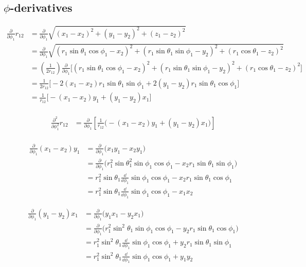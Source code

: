 \subsection*{$\phi$-derivatives}
\begin{align*}
    \frac{\partial}{\partial \phi_1}r_{12}
    &= \frac{\partial}{\partial \phi_1} \sqrt{(x_1 - x_2)^2 + (y_1 - y_2)^2 + (z_1 - z_2)^2} \\
    &= \frac{\partial}{\partial  \phi_1} \sqrt{(r_1\sin\theta_1\cos\phi_1 - x_2)^2 + (r_1\sin\theta_1\sin\phi_1 - y_2)^2 + (r_1\cos\theta_1 - z_2)^2} \\
    &= \left(\frac{1}{2r_{12}}\right) \frac{\partial}{\partial \phi_1} \Big[ (r_1\sin\theta_1\cos\phi_1 - x_2)^2 + (r_1\sin\theta_1\sin\phi_1 - y_2)^2 + (r_1\cos\theta_1 - z_2)^2 \Big] \\
    &= \frac{1}{2r_{12}} \Big[ -2(x_1-x_2)r_1\sin\theta_1\sin\phi_1 + 2(y_1-y_2)r_1\sin\theta_1\cos\phi_1 \Big] \\
    &= \frac{1}{r_{12}} \Big[ -(x_1-x_2)y_1 + (y_1-y_2)x_1 \Big] \\
\end{align*}

\begin{align*}
    \frac{\partial^2}{\partial \phi_1^2}r_{12} 
    &= \frac{\partial}{\partial \phi_1} \left[ \frac{1}{r_{12}} \Big( -(x_1-x_2)y_1 + (y_1-y_2)x_1 \Big) \right] \\    
\end{align*}

\begin{align*}
    \frac{\partial}{\partial \phi_1} (x_1-x_2)y_1
    &= \frac{\partial}{\partial \phi_1} \Big( x_1y_1 - x_2y_1 \Big) \\
    &= \frac{\partial}{\partial \phi_1} \Big( r_1^2 \sin\theta^2_1\sin\phi_1\cos\phi_1 - x_2r_1\sin\theta_1\sin\phi_1 \Big) \\
    &= r_1^2\sin\theta_1 \frac{\dd}{\dd \phi_1}\sin\phi_1\cos\phi_1 - x_2r_1\sin\theta_1 \cos\phi_1 \\
    &= r_1^2\sin\theta_1 \frac{\dd}{\dd \phi_1}\sin\phi_1\cos\phi_1 - x_1x_2
\end{align*}

\begin{align*}
    \frac{\partial}{\partial \phi_1} (y_1-y_2)x_1
    &= \frac{\partial}{\partial \phi_1} \Big( y_1x_1 - y_2x_1 \Big) \\
    &= \frac{\partial}{\partial \phi_1} \Big( r_1^2\sin^2\theta_1\sin\phi_1\cos\phi_1 - y_2r_1\sin\theta_1\cos\phi_1 \Big) \\
    &= r_1^2\sin^2\theta_1 \frac{\dd}{\dd \phi_1}\sin\phi_1\cos\phi_1 + y_2r_1\sin\theta_1\sin\phi_1 \\
    &= r_1^2\sin^2\theta_1 \frac{\dd}{\dd \phi_1}\sin\phi_1\cos\phi_1 + y_1y_2
\end{align*}

